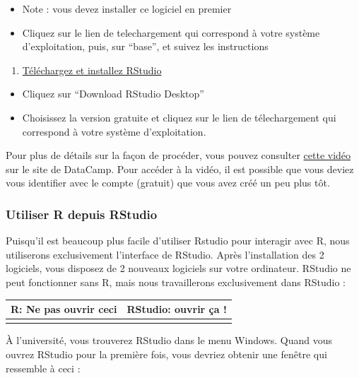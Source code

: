 \documentclass[a4paperpaper,]{article}
\providecommand{\tightlist}{%
  \setlength{\itemsep}{0pt}\setlength{\parskip}{0pt}}
\theoremstyle{definition}
\theoremstyle{definition}
\theoremstyle{definition}
\theoremstyle{remark}
\begin{document}
\begin{itemize}
\tightlist
\item
  Note : vous devez installer ce logiciel en premier
\item
  Cliquez sur le lien de telechargement qui correspond à votre système
  d'exploitation, puis, sur ``base'', et suivez les instructions
\end{itemize}

\begin{enumerate}
\def\labelenumi{\arabic{enumi}.}
\setcounter{enumi}{1}
\tightlist
\item
  \href{https://www.rstudio.com/products/RStudio/\#Desktop}{Téléchargez
  et installez RStudio}
\end{enumerate}

\begin{itemize}
\tightlist
\item
  Cliquez sur ``Download RStudio Desktop''
\item
  Choisissez la version gratuite et cliquez sur le lien de
  télechargement qui correspond à votre système d'exploitation.
\end{itemize}

Pour plus de détails sur la façon de procéder, vous pouvez consulter
\href{https://campus.datacamp.com/courses/working-with-the-rstudio-ide-part-1/orientation?ex=3}{cette
vidéo} sur le site de DataCamp. Pour accéder à la vidéo, il est possible
que vous deviez vous identifier avec le compte (gratuit) que vous avez
créé un peu plus tôt.

\hypertarget{utiliser-r-depuis-rstudio}{%
\subsubsection{Utiliser R depuis
RStudio}\label{utiliser-r-depuis-rstudio}}

Puisqu'il est beaucoup plus facile d'utiliser Rstudio pour interagir
avec R, nous utiliserons exclusivement l'interface de RStudio. Après
l'installation des 2 logiciels, vous disposez de 2 nouveaux logiciels
sur votre ordinateur. RStudio ne peut fonctionner sans R, mais nous
travaillerons exclusivement dans RStudio :

\begin{longtable}[]{@{}cc@{}}
\toprule
R: Ne pas ouvrir ceci & RStudio: ouvrir ça !\tabularnewline
\midrule
\endhead
&\tabularnewline
\bottomrule
\end{longtable}

À l'université, vous trouverez RStudio dans le menu Windows. Quand vous
ouvrez RStudio pour la première fois, vous devriez obtenir une fenêtre
qui ressemble à ceci :
\end{document}
